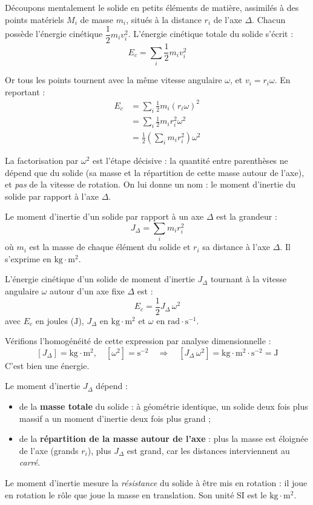 \documentclass[11pt]{article}
\newcommand{\cle}[1]{{\popxbold\color{popdark}#1}}
\begin{document}
Découpons mentalement le solide en petits éléments de matière, assimilés à des points matériels $M_i$ de masse $m_i$, situés à la distance $r_i$ de l'axe $\Delta$. Chacun possède l'énergie cinétique $\dfrac{1}{2}m_i v_i^2$. L'énergie cinétique totale du solide s'écrit :
\[ E_c = \sum_i \frac{1}{2}m_i v_i^2 \]

Or tous les points tournent avec la même vitesse angulaire $\omega$, et $v_i = r_i\omega$. En reportant :
\begin{align*}
E_c &= \sum_i \frac{1}{2}m_i (r_i\omega)^2 \\
    &= \sum_i \frac{1}{2}m_i r_i^2 \omega^2 \\
    &= \frac{1}{2}\left(\sum_i m_i r_i^2\right)\omega^2
\end{align*}

La factorisation par $\omega^2$ est l'étape décisive : la quantité entre parenthèses ne dépend que du solide (sa masse et la répartition de cette masse autour de l'axe), et \emph{pas} de la vitesse de rotation. On lui donne un nom : le \cle{moment d'inertie} du solide par rapport à l'axe $\Delta$.

\begin{definition}
Le \cle{moment d'inertie} d'un solide par rapport à un axe $\Delta$ est la grandeur :
\[ J_\Delta = \sum_i m_i r_i^2 \]
où $m_i$ est la masse de chaque élément du solide et $r_i$ sa distance à l'axe $\Delta$. Il s'exprime en $\mathrm{kg\cdot m^2}$.
\end{definition}

\begin{definition}
L'\cle{énergie cinétique} d'un solide de moment d'inertie $J_\Delta$ tournant à la vitesse angulaire $\omega$ autour d'un axe fixe $\Delta$ est :
\[ \boxed{E_c = \frac{1}{2}J_\Delta\,\omega^2} \]
avec $E_c$ en joules ($\mathrm{J}$), $J_\Delta$ en $\mathrm{kg\cdot m^2}$ et $\omega$ en $\mathrm{rad\cdot s^{-1}}$.
\end{definition}

Vérifions l'homogénéité de cette expression par analyse dimensionnelle :
\[ [J_\Delta] = \mathrm{kg\cdot m^2},\quad [\omega^2] = \mathrm{s^{-2}} \quad\Rightarrow\quad [J_\Delta\,\omega^2] = \mathrm{kg\cdot m^2\cdot s^{-2}} = \mathrm{J} \]
C'est bien une énergie.

\begin{propriete}
Le moment d'inertie $J_\Delta$ dépend :
\begin{itemize}
  \item de la \textbf{masse totale} du solide : à géométrie identique, un solide deux fois plus massif a un moment d'inertie deux fois plus grand ;
  \item de la \textbf{répartition de la masse autour de l'axe} : plus la masse est éloignée de l'axe (grands $r_i$), plus $J_\Delta$ est grand, car les distances interviennent au \emph{carré}.
\end{itemize}
Le moment d'inertie mesure la \emph{résistance} du solide à être mis en rotation : il joue en rotation le rôle que joue la masse en translation. Son unité SI est le $\mathrm{kg\cdot m^2}$.
\end{propriete}
\end{document}
